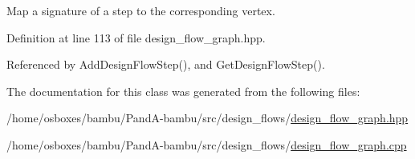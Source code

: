 Map a signature of a step to the corresponding vertex. 



Definition at line 113 of file design\+\_\+flow\+\_\+graph.\+hpp.



Referenced by Add\+Design\+Flow\+Step(), and Get\+Design\+Flow\+Step().



The documentation for this class was generated from the following files\+:\begin{DoxyCompactItemize}
\item 
/home/osboxes/bambu/\+Pand\+A-\/bambu/src/design\+\_\+flows/\hyperlink{design__flow__graph_8hpp}{design\+\_\+flow\+\_\+graph.\+hpp}\item 
/home/osboxes/bambu/\+Pand\+A-\/bambu/src/design\+\_\+flows/\hyperlink{design__flow__graph_8cpp}{design\+\_\+flow\+\_\+graph.\+cpp}\end{DoxyCompactItemize}
